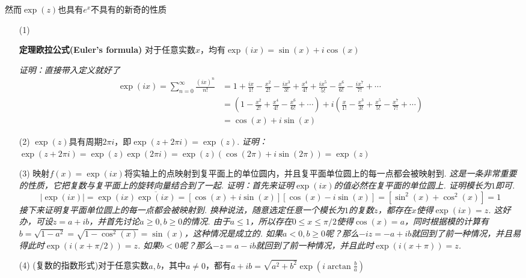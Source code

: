 \documentclass[UTF8]{ctexart}
\newenvironment{theorem}[1]
    {\begin{tcolorbox}[enhanced, colback=LightYellow, breakable=true, frame hidden, borderline west={1.5mm}{-2mm}{DarkBlue}]
    {\bfseries {\color{DarkBlue} 定理}\quad #1} \newline}
    {\end{tcolorbox}}
\begin{document}
然而\(\exp(z)\)也具有\(e^x\)不具有的新奇的性质
\begin{itemize}
    \item [(1)] \begin{theorem}{欧拉公式(Euler's formula)}
        对于任意实数\(x\)，均有\(\exp(ix) = \sin(x)+i\cos(x)\)
    \end{theorem}
    \textit{
        证明：直接带入定义就好了
    }
    \begin{align*}
        \exp(ix) = \sum_{n=0}^{\infty} \frac{(ix)^n}{n!} &= 1+\frac{ix}{1!}-\frac{x^2}{2!}-\frac{ix^3}{3!}+\frac{x^4}{4!}+\frac{ix^5}{5!}-\frac{x^6}{6!}-\frac{ix^7}{7!}+\cdots \\
        &= \left(1-\frac{x^2}{2!}+\frac{x^4}{4!}-\frac{x^6}{6!}+\cdots\right)+i\left(\frac{x}{1!}-\frac{x^3}{3!}+\frac{x^5}{5!}-\frac{x^7}{7!}+\cdots\right) \\
        &= \cos(x)+i\sin(x)
    \end{align*}
    \item [(2)] \(\exp(z)\)具有周期\(2\pi i\)，即\(\exp(z+2\pi i) = \exp(z)\).
    \newline
    \textit{
        证明：\(\exp(z+2\pi i) = \exp(z)\exp(2\pi i) = \exp(z)(\cos(2\pi)+i\sin(2\pi)) = \exp(z)\)
    }
    \item [(3)] 映射\(f(x) = \exp(ix)\)将实轴上的点映射到复平面上的单位圆内，并且复平面单位圆上的每一点都会被映射到.
    \newline
    \textit{
        这是一条非常重要的性质，它把复数与复平面上的旋转向量结合到了一起.
        \newline
        证明：首先来证明\(\exp(ix)\)的值必然在复平面的单位圆上. 证明模长为\(1\)即可.
        \[|\exp(ix)| = \exp(ix)\overline{\exp(ix)} = [\cos(x)+i\sin(x)][\cos(x)-i\sin(x)] = \left[\sin^2(x)+\cos^2(x)\right] = 1\]
        接下来证明复平面单位圆上的每一点都会被映射到. 换种说法，随意选定任意一个模长为\(1\)的复数\(z\)，都存在\(x\)使得\(\exp(ix)=z\). 这好办，可设\(z=a+ib\)，并首先讨论\(a \geq 0, b \geq 0\)的情况. 由于\(a\leq 1\)，所以存在\(0\leq x \leq \pi/2\)使得\(\cos(x)=a\)，同时根据模的计算有\(b=\sqrt{1-a^2}=\sqrt{1-\cos^2(x)}=\sin(x)\)，这种情况是成立的. 如果\(a<0, b \geq 0\)呢？那么\(-iz=-a+ib\)就回到了前一种情况，并且易得此时\(\exp(i(x+\pi/2))=z\). 如果\(b<0\)呢？那么\(-z=a-ib\)就回到了前一种情况，并且此时\(\exp(i(x+\pi))=z\).
    }
    \item [(4)] (复数的指数形式)对于任意实数\(a,b\)，其中\(a\neq 0\)，都有\(\displaystyle{a+ib = \sqrt{a^2+b^2}\exp\left(i\arctan\frac{b}{a}\right)}\)
    \newline

\end{itemize}
\end{document}
